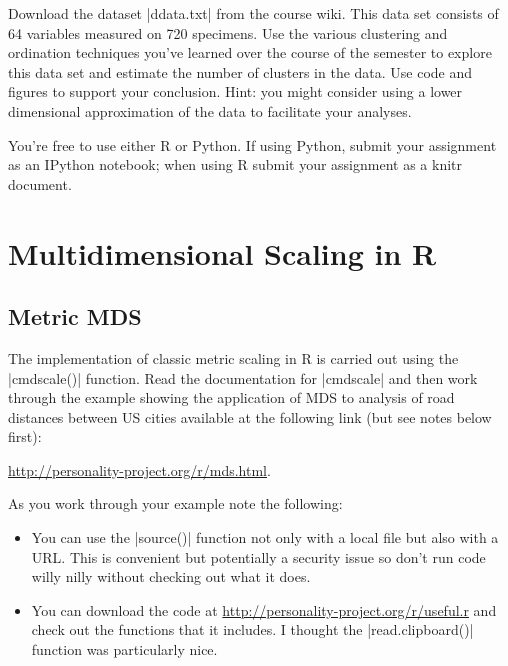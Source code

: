 \begin{assignment}
Download the dataset |ddata.txt| from the course wiki. This data set consists of 64 variables measured on 720 specimens. Use the various clustering and ordination techniques you've learned over the course of the semester to explore this data set and estimate the number of clusters in the data.  Use code and figures to support your conclusion.  Hint: you might consider using a lower dimensional approximation of the data to facilitate your analyses.

\smallskip
You're free to use either R or Python.  If using Python, submit your assignment as an IPython notebook; when using R submit your assignment as a knitr document.

\end{assignment}


\section{Multidimensional Scaling in R}

\subsection{Metric MDS}

The implementation of classic metric scaling in R is carried out using the |cmdscale()| function. Read the documentation for |cmdscale| and then work through the example showing the application of MDS to analysis of road distances between US cities available at the following link (but see notes below first):

\href{http://personality-project.org/r/mds.html}{http://personality-project.org/r/mds.html}.

\medskip
As you work through your example note the following:

\begin{itemize}
\item You can use the |source()| function not only with a local file but also with a URL.  This is convenient but potentially a security issue so don't run code willy nilly without checking out what it does.

\item You can download the code at \href{http://personality-project.org/r/useful.r}{http://personality-project.org/r/useful.r} and check out the functions that it includes. I thought the |read.clipboard()| function was particularly nice.
\end{itemize}



